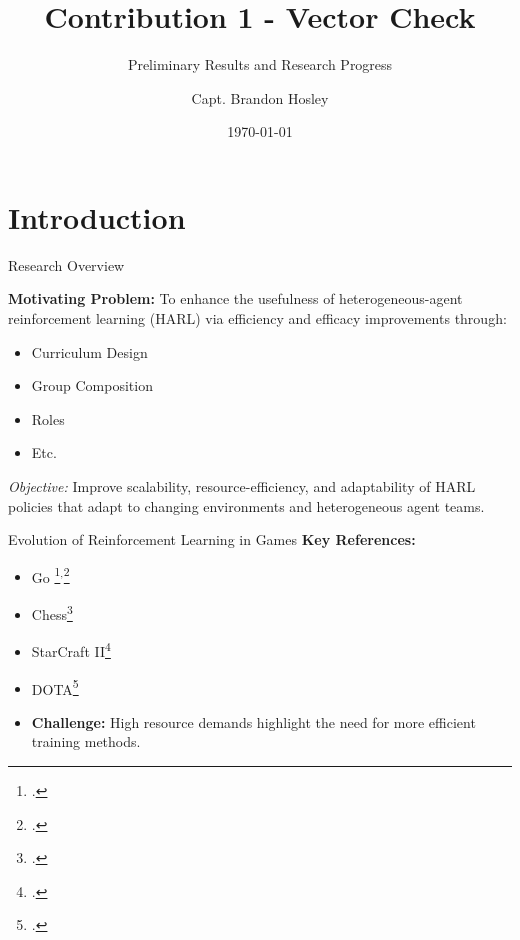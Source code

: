 \documentclass[xcolor={svgnames}]{beamer}
\title{Contribution 1 - Vector Check}
\subtitle{Preliminary Results and Research Progress}
\author{Capt. Brandon Hosley\inst{1}}
\institute[ENS]{
    \inst{1}
    Department of Operational Sciences\\
    Air Force Institute of Technology}
\date{\today}
\begin{document}
\frame{\titlepage}
\begin{frame}
    \tableofcontents
\end{frame}

\section{Introduction}

\begin{frame}{Research Overview}


    \textbf{Motivating Problem:}
    To enhance the usefulness of heterogeneous-agent reinforcement learning (HARL)
    via efficiency and efficacy improvements through:
    \begin{itemize}
        \item Curriculum Design
        \item Group Composition
        \item Roles
        \item Etc.
    \end{itemize}
    \vspace{0.5cm}

    \textit{Objective:} Improve scalability, resource-efficiency, and adaptability
    of HARL policies that adapt to changing environments and heterogeneous agent teams.
\end{frame}



\begin{frame}{Evolution of Reinforcement Learning in Games}
    \textbf{Key References:}
    \begin{itemize}
        \item Go \footcite{silver2016}$^,$\footcite{silver2017}
        \item Chess\footcite{silver2017a}
        \item StarCraft II\footcite{vinyals2019}
        \item DOTA\footcite{berner2019}
        \item \textbf{Challenge:} High resource demands highlight the need for more efficient 
            training methods.
    \end{itemize}
\end{frame}
\end{document}
